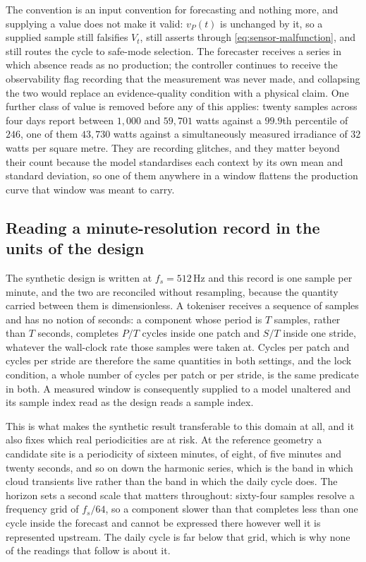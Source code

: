 The convention is an input convention for forecasting and nothing more, and supplying a value does not make it valid: $v_P(t)$ is unchanged by it, so a supplied sample still falsifies $V_t$, still asserts  through \autoref{eq:sensor-malfunction}, and still routes the cycle to safe-mode selection. The forecaster receives a series in which absence reads as no production; the controller continues to receive the observability flag recording that the measurement was never made, and collapsing the two would replace an evidence-quality condition with a physical claim. One further class of value is removed before any of this applies: twenty samples across four days report between $1{,}000$ and $59{,}701$ watts against a $99.9$th percentile of $246$, one of them $43{,}730$ watts against a simultaneously measured irradiance of $32$ watts per square metre. They are recording glitches, and they matter beyond their count because the model standardises each context by its own mean and standard deviation, so one of them anywhere in a window flattens the production curve that window was meant to carry.

\subsection{Reading a minute-resolution record in the units of the design}

The synthetic design is written at $f_s=512$\,Hz and this record is one sample per minute, and the two are reconciled without resampling, because the quantity carried between them is dimensionless. A tokeniser receives a sequence of samples and has no notion of seconds: a component whose period is $T$ samples, rather than $T$ seconds, completes $P/T$ cycles inside one patch and $S/T$ inside one stride, whatever the wall-clock rate those samples were taken at. Cycles per patch and cycles per stride are therefore the same quantities in both settings, and the lock condition, a whole number of cycles per patch or per stride, is the same predicate in both. A measured window is consequently supplied to a model unaltered and its sample index read as the design reads a sample index.

This is what makes the synthetic result transferable to this domain at all, and it also fixes which real periodicities are at risk. At the reference geometry a candidate site is a periodicity of sixteen minutes, of eight, of five minutes and twenty seconds, and so on down the harmonic series, which is the band in which cloud transients live rather than the band in which the daily cycle does. The horizon sets a second scale that matters throughout: sixty-four samples resolve a frequency grid of $f_s/64$, so a component slower than that completes less than one cycle inside the forecast and cannot be expressed there however well it is represented upstream. The daily cycle is far below that grid, which is why none of the readings that follow is about it.

